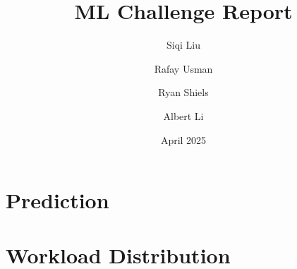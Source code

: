 \documentclass[journal]{IEEEtran}
\title{ML Challenge Report}
\author{
  Siqi Liu
  \and
  Rafay Usman
  \and
  Ryan Shiels
  \and
  Albert Li
}
\date{April 2025}
\begin{document}
\maketitle







\section{Prediction}

\section{Workload Distribution}
\end{document}
